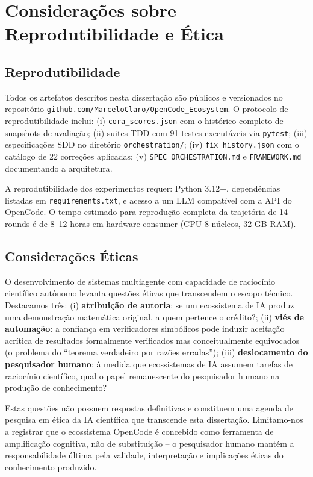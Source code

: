 \section{Considerações sobre Reprodutibilidade e Ética}

\subsection{Reprodutibilidade}

Todos os artefatos descritos nesta dissertação são públicos e versionados
no repositório \texttt{github.com/MarceloClaro/OpenCode\_Ecosystem}. O
protocolo de reprodutibilidade inclui: (i) \texttt{cora\_scores.json} com
o histórico completo de snapshots de avaliação; (ii) suites TDD com 91
testes executáveis via \texttt{pytest}; (iii) especificações SDD no
diretório \texttt{orchestration/}; (iv) \texttt{fix\_history.json} com o
catálogo de 22 correções aplicadas; (v) \texttt{SPEC\_ORCHESTRATION.md} e
\texttt{FRAMEWORK.md} documentando a arquitetura.

A reprodutibilidade dos experimentos requer: Python 3.12+, dependências
listadas em \texttt{requirements.txt}, e acesso a um LLM compatível com a
API do OpenCode. O tempo estimado para reprodução completa da trajetória
de 14 rounds é de 8--12 horas em hardware consumer (CPU 8 núcleos, 32 GB
RAM).

\subsection{Considerações Éticas}

O desenvolvimento de sistemas multiagente com capacidade de raciocínio
científico autônomo levanta questões éticas que transcendem o escopo
técnico. Destacamos três: (i) \textbf{atribuição de autoria}: se um
ecossistema de IA produz uma demonstração matemática original, a quem
pertence o crédito?; (ii) \textbf{viés de automação}: a confiança em
verificadores simbólicos pode induzir aceitação acrítica de resultados
formalmente verificados mas conceitualmente equivocados (o problema do
``teorema verdadeiro por razões erradas''); (iii) \textbf{deslocamento
do pesquisador humano}: à medida que ecossistemas de IA assumem tarefas
de raciocínio científico, qual o papel remanescente do pesquisador humano
na produção de conhecimento?

Estas questões não possuem respostas definitivas e constituem uma agenda
de pesquisa em ética da IA científica que transcende esta dissertação.
Limitamo-nos a registrar que o ecossistema OpenCode é concebido como
ferramenta de amplificação cognitiva, não de substituição -- o
pesquisador humano mantém a responsabilidade última pela validade,
interpretação e implicações éticas do conhecimento produzido.

